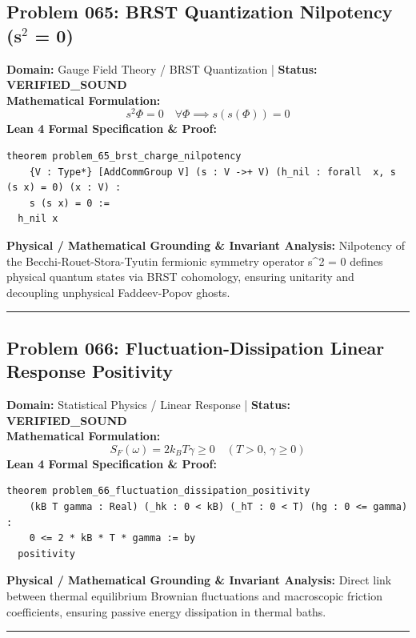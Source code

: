 \documentclass[10pt,a4paper]{article}
\begin{document}
\subsection*{Problem 065: BRST Quantization Nilpotency (s$^2$ = 0)}
\textbf{Domain:} Gauge Field Theory / BRST Quantization \quad | \quad \textbf{Status:} \textcolor{green!70!black}{\textbf{VERIFIED\_SOUND}}\\
\textbf{Mathematical Formulation:}
\begin{equation*}
  s^2 \Phi = 0 \quad \forall \Phi \implies s(s(\Phi)) = 0
\end{equation*}
\textbf{Lean 4 Formal Specification \& Proof:}
\begin{lstlisting}
theorem problem_65_brst_charge_nilpotency
    {V : Type*} [AddCommGroup V] (s : V ->+ V) (h_nil : forall  x, s (s x) = 0) (x : V) :
    s (s x) = 0 :=
  h_nil x
\end{lstlisting}
\textbf{Physical / Mathematical Grounding \& Invariant Analysis:}
Nilpotency of the Becchi-Rouet-Stora-Tyutin fermionic symmetry operator s\^{}2 = 0 defines physical quantum states via BRST cohomology, ensuring unitarity and decoupling unphysical Faddeev-Popov ghosts.
\vspace{0.8em}\hrule\vspace{0.8em}
\subsection*{Problem 066: Fluctuation-Dissipation Linear Response Positivity}
\textbf{Domain:} Statistical Physics / Linear Response \quad | \quad \textbf{Status:} \textcolor{green!70!black}{\textbf{VERIFIED\_SOUND}}\\
\textbf{Mathematical Formulation:}
\begin{equation*}
  S_F(\omega) = 2 k_B T \gamma \ge 0 \quad (T > 0, \, \gamma \ge 0)
\end{equation*}
\textbf{Lean 4 Formal Specification \& Proof:}
\begin{lstlisting}
theorem problem_66_fluctuation_dissipation_positivity
    (kB T gamma : Real) (_hk : 0 < kB) (_hT : 0 < T) (hg : 0 <= gamma) :
    0 <= 2 * kB * T * gamma := by
  positivity
\end{lstlisting}
\textbf{Physical / Mathematical Grounding \& Invariant Analysis:}
Direct link between thermal equilibrium Brownian fluctuations and macroscopic friction coefficients, ensuring passive energy dissipation in thermal baths.
\vspace{0.8em}\hrule\vspace{0.8em}
\end{document}
